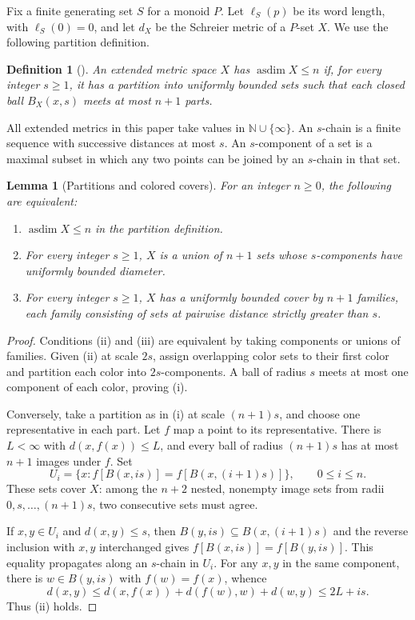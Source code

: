 \documentclass[10pt,a4paper]{amsart}
\newtheorem{lemma}[theorem]{Lemma}
\newtheorem{definition}[theorem]{Definition}
\DeclareMathOperator{\asdim}{asdim}
\newcommand{\NN}{\mathbb N}
\begin{document}
Fix a finite generating set $S$ for a monoid $P$. Let $\ell_S(p)$ be its
word length, with $\ell_S(0)=0$, and let $d_X$ be the Schreier metric of a
$P$-set $X$. We use the following partition definition.

\begin{definition}[\cite{CJMST}]
An extended metric space $X$ has $\asdim X\le n$ if, for every integer
$s\ge1$, it has a partition into uniformly bounded sets such that each
closed ball $B_X(x,s)$ meets at most $n+1$ parts.
\end{definition}

All extended metrics in this paper take values in $\NN\cup\{\infty\}$. An $s$-chain is a finite sequence with successive
distances at most $s$. An $s$-component of a set is a maximal subset in
which any two points can be joined by an $s$-chain in that set.

\begin{lemma}[Partitions and colored covers]\label{lem:colored}
For an integer $n\ge0$, the following are equivalent:
\begin{enumerate}[label=(\roman*),itemsep=0.15em,topsep=0.3em]
\item $\asdim X\le n$ in the partition definition.
\item For every integer $s\ge1$, $X$ is a union of $n+1$ sets whose
$s$-components have uniformly bounded diameter.
\item For every integer $s\ge1$, $X$ has a uniformly bounded cover by
$n+1$ families, each family consisting of sets at pairwise distance
strictly greater than $s$.
\end{enumerate}
\end{lemma}

\begin{proof}
Conditions (ii) and (iii) are equivalent by taking components or unions of
families. Given (ii) at scale $2s$, assign overlapping color sets to their
first color and partition each color into $2s$-components. A ball of
radius $s$ meets at most one component of each color, proving (i).

Conversely, take a partition as in (i) at scale $(n+1)s$, and choose one
representative in each part. Let $f$ map a point to its representative.
There is $L<\infty$ with $d(x,f(x))\le L$, and every ball of radius
$(n+1)s$ has at most $n+1$ images under $f$. Set
\[
 U_i=\{x:f[B(x,is)]=f[B(x,(i+1)s)]\},\qquad 0\le i\le n.
\]
These sets cover $X$: among the $n+2$ nested, nonempty image sets from
radii $0,s,\ldots,(n+1)s$, two consecutive sets must agree.

If $x,y\in U_i$ and $d(x,y)\le s$, then
$B(y,is)\subseteq B(x,(i+1)s)$ and the reverse inclusion with $x,y$
interchanged gives
$f[B(x,is)]=f[B(y,is)]$. This equality propagates along an $s$-chain in
$U_i$. For any $x,y$ in the same component, there is
$w\in B(y,is)$ with $f(w)=f(x)$, whence
\[
 d(x,y)\le d(x,f(x))+d(f(w),w)+d(w,y)\le2L+is.
\]
Thus (ii) holds.
\end{proof}
\end{document}
